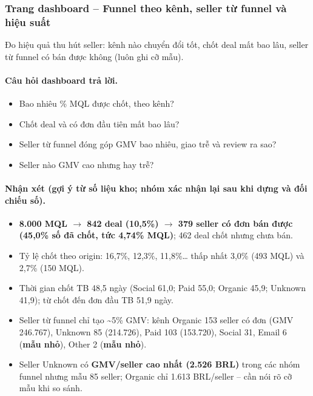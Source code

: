 \subsubsection*{Trang dashboard -- Funnel theo kênh, seller từ funnel và hiệu suất}

Đo hiệu quả thu hút seller: kênh nào chuyển đổi tốt, chốt deal mất bao lâu, seller từ funnel có bán được không (luôn ghi cỡ mẫu).

\paragraph{Câu hỏi dashboard trả lời.}

\begin{itemize}
  \item Bao nhiêu \% MQL được chốt, theo kênh?
  \item Chốt deal và có đơn đầu tiên mất bao lâu?
  \item Seller từ funnel đóng góp GMV bao nhiêu, giao trễ và review ra sao?
  \item Seller nào GMV cao nhưng hay trễ?
\end{itemize}



\paragraph{Nhận xét (gợi ý từ số liệu kho; \textbf{nhóm xác nhận lại sau khi dựng và đối chiếu số}).}

\begin{itemize}
  \item \textbf{8.000 MQL $\rightarrow$ 842 deal (10,5\%) $\rightarrow$ 379 seller có đơn bán được (45,0\% số đã chốt, tức 4,74\% MQL)}; 462 deal chốt nhưng chưa bán.
  \item Tỷ lệ chốt theo origin:  16,7\%,  12,3\%,  11,8\%… thấp nhất  3,0\% (493 MQL) và  2,7\% (150 MQL).
  \item Thời gian chốt TB 48,5 ngày (Social 61,0; Paid 55,0; Organic 45,9; Unknown 41,9); từ chốt đến đơn đầu TB 51,9 ngày.
  \item Seller từ funnel chỉ tạo \textasciitilde{}5\% GMV: kênh Organic 153 seller có đơn (GMV 246.767), Unknown 85 (214.726), Paid 103 (153.720), Social 31, Email 6 (\textbf{mẫu nhỏ}), Other 2 (\textbf{mẫu nhỏ}).
  \item Seller Unknown có \textbf{GMV/seller cao nhất (2.526 BRL)} trong các nhóm funnel nhưng mẫu 85 seller; Organic chỉ 1.613 BRL/seller – cần nói rõ cỡ mẫu khi so sánh.
\end{itemize}

